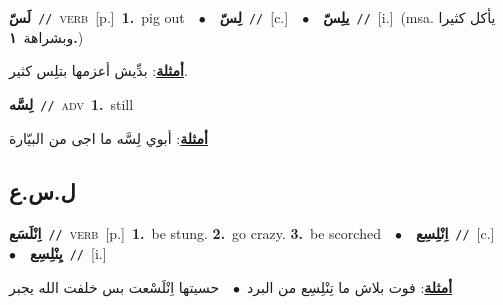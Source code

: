 \documentclass[10pt,a4paper,twoside]{article} %
\begin{document}
\begin{multicols}{2}
{\setlength\topsep{0pt}\textbf{\foreignlanguage{arabic}{لَسّ}}\ {\color{gray}\texttt{//}\color{black}}\ \textsc{verb}\ [p.]\ \textbf{1.}~pig out\ \ $\bullet$\ \ \setlength\topsep{0pt}\textbf{\foreignlanguage{arabic}{لِسّ}}\ {\color{gray}\texttt{//}\color{black}}\ [c.]\ \ $\bullet$\ \ \setlength\topsep{0pt}\textbf{\foreignlanguage{arabic}{يلِسّ}}\ {\color{gray}\texttt{//}\color{black}}\ [i.]\ \color{gray}(msa. \foreignlanguage{arabic}{يأكل كثيرا وبشراهة}~\foreignlanguage{arabic}{\textbf{١.}})\color{black}\  \begin{flushright}\color{gray}\foreignlanguage{arabic}{\textbf{\underline{\foreignlanguage{arabic}{أمثلة}}}: بدِّيش أعزمها بتلِس كثير.}\end{flushright}\color{black}} \vspace{2mm}

{\setlength\topsep{0pt}\textbf{\foreignlanguage{arabic}{لِسَّه}}\ {\color{gray}\texttt{//}\color{black}}\ \textsc{adv}\ \textbf{1.}~still\  \begin{flushright}\color{gray}\foreignlanguage{arabic}{\textbf{\underline{\foreignlanguage{arabic}{أمثلة}}}: أبوي لِسَّه ما اجى من البيّارة}\end{flushright}\color{black}} \vspace{2mm}

\vspace{-3mm}
\subsection*{\color{blue}\foreignlanguage{arabic}{ل.س.ع}\color{blue}{}} 

{\setlength\topsep{0pt}\textbf{\foreignlanguage{arabic}{اِنْلَسَع}}\ {\color{gray}\texttt{//}\color{black}}\ \textsc{verb}\ [p.]\ \textbf{1.}~be stung.  \textbf{2.}~go crazy.  \textbf{3.}~be scorched\ \ $\bullet$\ \ \setlength\topsep{0pt}\textbf{\foreignlanguage{arabic}{اِنْلِسِع}}\ {\color{gray}\texttt{//}\color{black}}\ [c.]\ \ $\bullet$\ \ \setlength\topsep{0pt}\textbf{\foreignlanguage{arabic}{يِنْلِسِع}}\ {\color{gray}\texttt{//}\color{black}}\ [i.]\  \begin{flushright}\color{gray}\foreignlanguage{arabic}{\textbf{\underline{\foreignlanguage{arabic}{أمثلة}}}: فوت بلاش ما تِنْلِسِع من البرد\ $\bullet$\ \  حسيتها اِنْلَسْعت بس خلفت الله يجبر}\end{flushright}\color{black}} \vspace{2mm}


\end{multicols}
\end{document}

